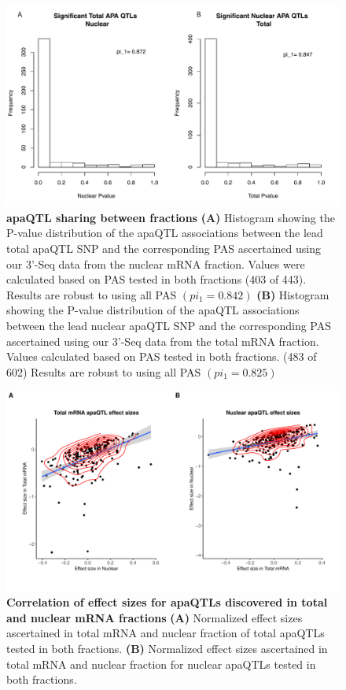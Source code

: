 \begin{figure}[!htb]
\centering
\includegraphics[width=5in]{img/ch02/Fig2_figuresupplement7.pdf}
\caption[apaQTL sharing between fractions]{\textbf{apaQTL sharing between fractions} {\bf (A)}	 Histogram showing the P-value distribution of the apaQTL associations between the lead total apaQTL SNP and the corresponding PAS ascertained using our 3'-Seq data from the nuclear mRNA fraction. Values were calculated based on PAS tested in both fractions (403 of 443). Results are robust to using all PAS $(pi_1=0.842)$ {\bf (B)} Histogram showing the P-value distribution of the apaQTL associations between the lead nuclear apaQTL SNP and the corresponding PAS ascertained using our 3'-Seq data from the total mRNA fraction. Values calculated based on PAS tested in both fractions. (483 of 602) Results are robust to using all PAS $(pi_1=0.825)$}
\label{fig:QTLshare}
\end{figure}
\clearpage


\begin{figure}[!htb]
\centering
\includegraphics[width=5in]{img/ch02/Fig2_figuresupplement8.pdf}
\caption[Correlation of effect sizes for apaQTLs discovered in total and nuclear mRNA fractions]{\textbf{Correlation of effect sizes for apaQTLs discovered in total and nuclear mRNA fractions} {\bf (A)} Normalized effect sizes ascertained in total mRNA and nuclear fraction of total apaQTLs tested in both fractions. {\bf (B)} Normalized effect sizes ascertained in total mRNA and nuclear fraction for nuclear apaQTLs tested in both fractions.}
\label{fig:apaQTLcorr}
\end{figure}
\clearpage

